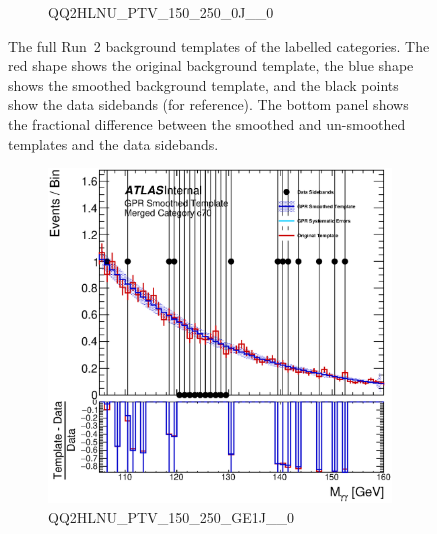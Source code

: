 \begin{figure}
\begin{center}
\begin{subfigure}[T]{0.49\linewidth}
	\caption{QQ2HLNU\_PTV\_150\_250\_0J\_\_0}
\end{subfigure}
\caption{The full Run~2 background templates of the labelled categories. The red shape shows the original background template, the blue shape shows the smoothed background template, and the black points show the data sidebands (for reference). The bottom panel shows the fractional difference between the smoothed and un-smoothed templates and the data sidebands. }
 \label{fig:gpr_coupcat_17}
 \end{center}
\end{figure}

\begin{figure}
\begin{center}
\begin{subfigure}[T]{0.49\linewidth}
	\centering
	\includegraphics[width=\linewidth]{figures/background/gpr/coupCatTemplates/GPR_Smoothed_Plot_hmgg_c70.eps}
	\caption{QQ2HLNU\_PTV\_150\_250\_GE1J\_\_0}
\end{subfigure}
\begin{subfigure}[T]{0.49\linewidth}
	\centering

\end{subfigure}
\end{center}
\end{figure}
